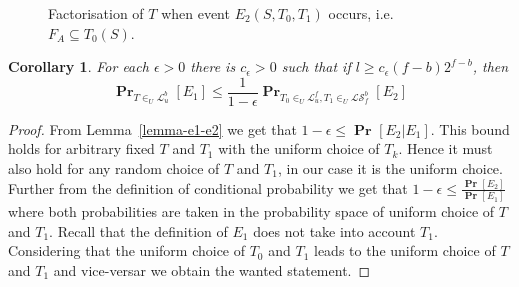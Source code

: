 \documentclass{article}
\newcommand{\vecspace}[2]{\mathbb{Z}_{#1}^{#2}}
\newcommand{\binvecspace}[1]{\vecspace{2}{#1}}
\newcommand{\linearmaps}[2]{\mathcal{L}_{#1}^{#2}}
\newcommand{\surjectivelinearmaps}[2]{\mathcal{LS}_{#1}^{#2}}
\newcommand{\probs}[2]{\operatorname{\mathbf{Pr}}_{{#1}}\left[{#2}\right]}
\newcommand{\prob}[1]{\probs{}{#1}}
\newtheorem{corollary}{Corollary}
\begin{document}
\begin{figure}
	\caption{Factorisation of $T$ when event $E_2(S, T_0, T_1)$ occurs, i.e. $F_A \subseteq T_0(S)$.}
	\label{fig-factorisation-e2}

\begin{center}
\end{center}
\end{figure}

\begin{corollary}
\label{corollary-e1-e2}
For each $\epsilon > 0$ there is $c_\epsilon > 0$ such that if $l \geq c_\epsilon (f - b)2^{f-b}$, then
\[
\probs{T \in_U \linearmaps{u}{b}}{E_1} \leq \frac{1}{1 - \epsilon}\probs{T_0 \in_U \linearmaps{u}{f}, T_1 \in_U \surjectivelinearmaps{f}{b}}{E_2}
\]
\end{corollary}
\begin{proof}
From Lemma~\ref{lemma-e1-e2} we get that $1 - \epsilon \leq \prob{E_2 | E_1}$.
This bound holds for arbitrary fixed $T$ and $T_1$ with the uniform choice of $T_k$.
Hence it must also hold for any random choice of $T$ and $T_1$, in our case it is the uniform choice.
Further from the definition of conditional probability we get that $1 - \epsilon \leq \frac{\prob{E_2}}{\prob{E_1}}$ where both probabilities are taken in the probability space of uniform choice of $T$ and $T_1$.
Recall that the definition of $E_1$ does not take into account $T_1$.
Considering that the uniform choice of $T_0$ and $T_1$ leads to the uniform choice of $T$ and $T_1$ and vice-versar we obtain the wanted statement.
\end{proof}
\end{document}
